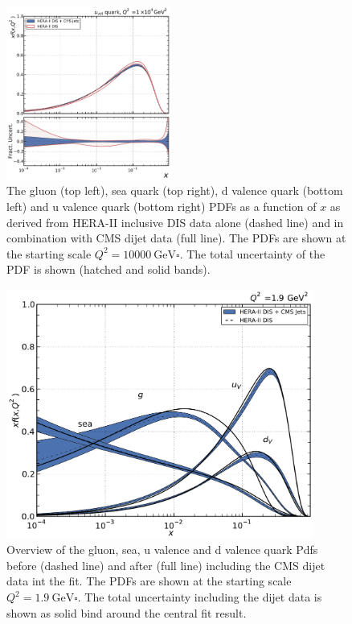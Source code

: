 \begin{figure}[tbp]
  \includegraphics[width=0.48\textwidth]{figures/pdf_constraints/hftd/direct/HFTD_HERACMSTDJETS_V017_EIG/pdfratio/HFTD_HERACMSTDJETS_V017_EIG_8_10000_0.pdf}
  \caption[Direct comparison of gluon and quark PDFs]{The gluon (top left), sea
  quark (top right), d valence quark (bottom left) and u valence quark (bottom
right) PDFs as a function of $x$ as derived from HERA-II inclusive DIS data
alone (dashed line) and in combination with CMS dijet data (full line). The PDFs
are shown at the starting scale $Q^2 = \SI{10000}{\GeV \square}$. The total
uncertainty of the PDF is shown (hatched and solid bands).}
\label{fig:pdfconstraints:direct:10000}
\end{figure}

\begin{figure}[tbp]
  \centering
  \includegraphics[width=0.9\textwidth]{figures/pdf_constraints/hftd/overview/HFTD_HERACMSTDJETS_V017_EIG/pdfoverview/HFTD_HERACMSTDJETS_V017_EIG_1_9.pdf}\hfill%
  \caption[Overview of gluon and quark PDFs]{Overview of the gluon, sea, u
  valence and d valence quark Pdfs before (dashed line) and after (full line)
  including the CMS dijet data int the fit. The PDFs are shown at the starting
  scale $Q^2 = \SI{1.9}{\GeV \square}$. The total uncertainty including the dijet
  data is shown as solid bind around the central fit result.}
  \label{fig:pdfconstraints:overview:19}
\end{figure}

